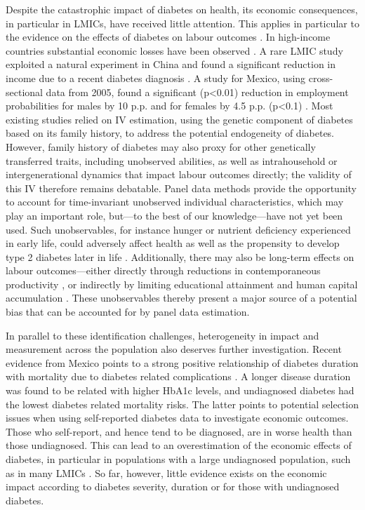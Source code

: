 \documentclass[12pt,english]{article}
\begin{document}
Despite the catastrophic impact of diabetes on health, its economic consequences, in particular in \acp{LMIC}, have received little attention. This applies in particular to the evidence on the effects of diabetes on labour outcomes \parencite{Seuring2015a}. In high-income countries substantial economic losses have been observed \parencite{Brown2005,Brown2014,BrownIII2011,Minor2011,Minor2013,Minor2015,Latif2009}. A rare \ac{LMIC} study exploited a natural experiment in China and found a significant reduction in income due to a recent diabetes diagnosis \parencite{Liu2014}. A study for Mexico, using cross-sectional data from 2005, found a significant (p<0.01) reduction in employment probabilities for males by 10 \ac{p.p.} and for females by 4.5 \ac{p.p.} (p<0.1) \parencite{Seuring2015}. Most existing studies relied on \ac{IV} estimation, using the genetic component of diabetes based on its family history, to address the potential endogeneity of diabetes.  However, family history of diabetes may also proxy for other genetically transferred traits, including unobserved abilities, as well as intrahousehold or intergenerational dynamics that impact labour outcomes directly; the validity of this \ac{IV} therefore remains debatable. Panel data methods provide the opportunity to account for time-invariant unobserved individual characteristics, which may play an important role, but---to the best of our knowledge---have not yet been used. Such unobservables, for instance hunger or nutrient deficiency experienced in early life, could adversely affect health as well as the propensity to develop type 2 diabetes later in life \parencite{VanEwijk2011,Sotomayor2013,Li2010b}. Additionally, there may also be long-term effects on labour outcomes---either directly through reductions in contemporaneous productivity \parencite{Currie2013}, or indirectly by limiting educational attainment and human capital accumulation \parencite{Ayyagari2011a}. These unobservables thereby present a major source of a potential bias that can be accounted for by panel data estimation.

In parallel to these identification challenges, heterogeneity in impact and measurement across the population also deserves further investigation. Recent evidence from Mexico points to a strong positive relationship of diabetes duration with mortality due to diabetes related complications \parencite{Herrington2018}. A longer disease duration was found to be related with higher \ac{HbA1c} levels, and undiagnosed diabetes had the lowest diabetes related mortality risks. The latter points to potential selection issues when using self-reported diabetes data to investigate economic outcomes. Those who self-report, and hence tend to be diagnosed, are in worse health than those undiagnosed. This can lead to an overestimation of the economic effects of diabetes, in particular in populations with a large undiagnosed population, such as in many \acp{LMIC} \parencite{Beagley2014}. So far, however, little evidence exists on the economic impact according to diabetes severity, duration or for those with undiagnosed diabetes. 
\end{document}
